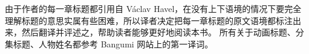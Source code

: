 由于作者的每一章标题都引用自 Václav Havel，在没有上下语境的情况下要完全理解标题的意思实属有些困难，所以译者决定把每一章标题的原文语境都标注出来，然后翻译并评述之，帮助读者能够更好地阅读本书。
所有关于动画标题、分集标题、人物姓名都参考 Bangumi 网站上的第一译词。
